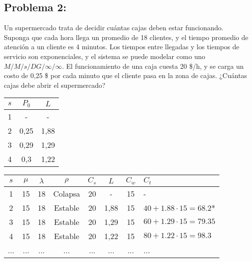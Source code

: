 \documentclass{templateNote}
\begin{document}
\subsection{Problema 2:}
Un supermercado trata de decidir cu\'antas cajas deben estar funcionando. Suponga que cada hora llega un promedio de 18 clientes, y el tiempo promedio de atenci\'on a un cliente es 4 minutos. Los tiempos entre llegadas y los tiempos de servicio son exponenciales, y el sistema se puede modelar como uno $M/M/s/DG/\infty/\infty$. El funcionamiento de una caja cuesta 20 \$/h, y se carga un costo de 0,25 \$ por cada minuto que el cliente pasa en la zona de cajas. ¿Cu\'antas cajas debe abrir el supermercado?
\begin{center}
    \begin{tabular}{|c|c|c|}
        \hline
        $s$ & $P_0$ & $L$ \\ \hline
        1 & - & - \\
        2 & 0,25 & 1,88 \\
        3 & 0,29 & 1,29 \\
        4 & 0,3 & 1,22 \\ \hline
    \end{tabular}
\end{center}
\begin{center}
    \begin{tabular}{ccccccc|l}
        $s$ & $\mu$ & $\lambda$ & $\rho$ & $C_s$ & $L$ & $C_w$ & $C_t$\\ \hline
        1 & 15 & 18 & Colapsa & 20 & - & 15 & - \\
        2 & 15 & 18 & Estable & 20 & 1,88 & 15 & $40 + 1.88 \cdot 15 = 68.2$* \\
        3 & 15 & 18 & Estable & 20 & 1,29 & 15 & $60 + 1.29 \cdot 15 = 79.35$ \\
        4 & 15 & 18 & Estable & 20 & 1,22 & 15 & $80 + 1.22 \cdot 15 = 98.3$ \\
        ... & ... & ... & ... & ... & ... & ... & ... \\
    \end{tabular}
\end{center}
\end{document}
